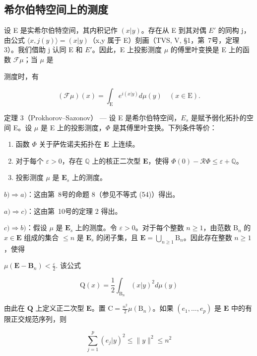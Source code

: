 \subsection{希尔伯特空间上的测度}

设 E 是实希尔伯特空间，其内积记作 \((x|y)\)。存在从 E 到其对偶 \(E'\) 的同构 j，由公式 \(\langle x,j(y)\rangle=(x|y)\)（x,y 属于 E）刻画（TVS, V, §1，第~7号，定理 3）。我们借助 j 认同 E 和 \(E'\)。因此，E 上投影测度 \(\mu\) 的傅里叶变换是 E 上的函数 \(\mathcal{F}\mu\)；当 \(\mu\) 是

测度时，有

\[
(\mathcal {F} \mu) (x) = \int_ {\mathrm{E}} e ^ {i (x | y)} d \mu (y) \quad (x \in \mathrm{E}).\tag{64}
\]

定理 3（Prokhorov--Sazonov） --- 设 E 是希尔伯特空间，\(E_{s}\) 是赋予弱化拓扑的空间 E。设 \(\mu\) 是 E 上的投影测度，\(\Phi\) 是其傅里叶变换。下列条件等价：

\begin{enumerate}
\def\labelenumi{\alph{enumi})}
\item
  函数 \(\Phi\) 关于萨佐诺夫拓扑在 \(\mathbf{E}\) 上连续。
\item
  对于每个 \(\varepsilon > 0\)，存在 \(\mathbb{Q}\) 上的核正二次型 \(\mathbf{E}\)，使得 \(\Phi(0) - \mathcal{R}\Phi \leqslant \varepsilon + \mathbb{Q}\)。
\item
  投影测度 \(\mu\) 是 \(\mathbf{E}_s\) 上的测度。
\end{enumerate}

\(b) \Rightarrow a)\)：这由第~8号的命题 8（参见不等式 (54)）得出。

\(a) \Rightarrow c)\)：这由第~10号的定理 2 得出。

\(c) \Rightarrow b)\)：假设 \(\mu\) 是 \(\mathbf{E}_s\) 上的测度。令 \(\varepsilon > 0\)。对于每个整数 \(n \geqslant 1\)，由范数 \(\mathrm{B}_n\) 的 \(x \in \mathbf{E}\) 组成的集合 \(\leqslant n\) 是 \(\mathbf{E}_s\) 的闭子集，且 \(\mathbf{E} = \bigcup_{n \geqslant 1} \mathrm{B}_n\)。因此存在整数 \(n \geqslant 1\)，使得

\(\mu (\mathbf{E} - \mathbf{B}_n) <   \frac{\varepsilon}{2}.\) 该公式

\[
\mathrm{Q} (x) = \frac {1}{2} \int_ {\mathrm{B} _ {n}} (x | y) ^ {2} d \mu (y)\tag{65}
\]

由此在 \(\mathbf{Q}\) 上定义正二次型 \(\mathbf{E}\)。置 \(\mathrm{C} = \frac{n^2}{2}\mu (\mathrm{B}_n)\)。如果 \((e_1,\ldots ,e_p)\) 是 \(\mathbf{E}\) 中的有限正交规范序列，则

\[
\sum_ {j = 1} ^ {p} (e _ {j} | y) ^ {2} \leqslant \| y \| ^ {2} \leqslant n ^ {2}
\]

